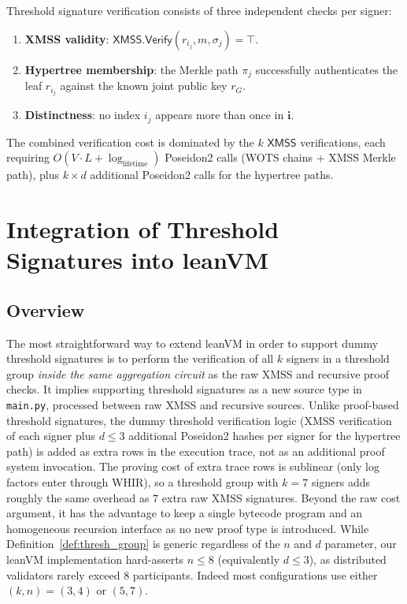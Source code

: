\documentclass[11pt,a4paper]{article}
\newcommand{\XMSS}{\textsf{XMSS}\xspace}
\newcommand{\poseidon}{\textsf{Poseidon2}\xspace}
\newcommand{\WHIR}{\textsf{WHIR}\xspace}
\newcommand{\leanVM}{\textsf{leanVM}\xspace}
\begin{document}
\bigskip
\noindent Threshold signature verification consists of three independent checks per signer:
\begin{enumerate}
  \item \textbf{XMSS validity}: $\XMSS.\mathsf{Verify}(r_{i_j}, m, \sigma_j) = \top$.
  \item \textbf{Hypertree membership}: the Merkle path $\pi_j$ successfully authenticates the leaf $r_{i_j}$ against the known joint public key $r_G$.
  \item \textbf{Distinctness}: no index $i_j$ appears more than once in $\mathbf{i}$.
\end{enumerate}

\noindent The combined verification cost is dominated by the $k$ $\XMSS$ verifications, each requiring $O(V \cdot L + \log_{\text{lifetime}})$ \poseidon calls (WOTS chains + \XMSS Merkle path), plus $k \times d$ additional \poseidon calls for the hypertree paths.


\section{Integration of Threshold Signatures into leanVM}

\subsection{Overview}
The most straightforward way to extend \leanVM in order to support dummy threshold signatures is to perform the verification of all $k$ signers in a threshold group \emph{inside the same aggregation circuit} as the raw \XMSS and recursive proof checks.
It implies supporting threshold signatures as a new source type in \texttt{main.py}, processed between raw \XMSS and recursive sources.
Unlike proof-based threshold signatures, the dummy threshold verification logic (\XMSS verification of each signer plus $d \leq 3$ additional \poseidon hashes per signer for the hypertree path) is added as extra rows in the execution trace, not as an additional proof system invocation.  The proving cost of extra trace rows is sublinear (only log factors enter through \WHIR), so a threshold group with $k = 7$ signers adds roughly the same overhead as $7$ extra raw \XMSS signatures.
Beyond the raw cost argument, it has the advantage to keep a single bytecode program and an homogeneous recursion interface as no new proof type is introduced.
While Definition~\ref{def:thresh_group} is generic regardless of the $n$ and $d$ parameter, our \leanVM implementation hard-asserts $n \leq 8$ (equivalently $d \leq 3$), as distributed validators rarely exceed 8 participants. Indeed most configurations use either $(k,n) = (3,4)$ or $(5,7)$. 
\end{document}

